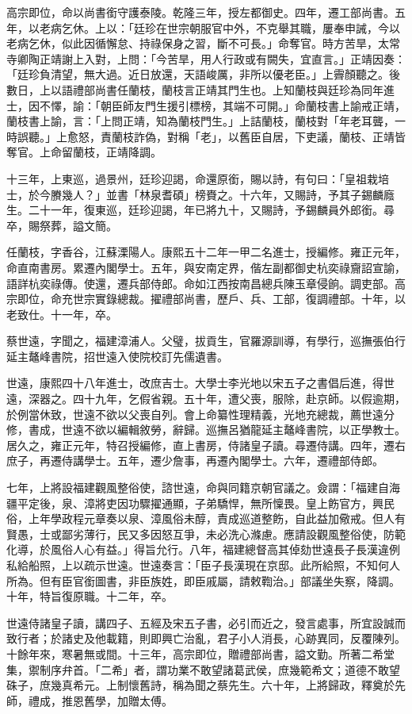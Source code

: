 \begin{pinyinscope}
高宗即位，命以尚書銜守護泰陵。乾隆三年，授左都御史。四年，遷工部尚書。五年，以老病乞休。上以：「廷珍在世宗朝服官中外，不克舉其職，屢奉申誡，今以老病乞休，似此因循懈怠、持祿保身之習，斷不可長。」命奪官。時方苦旱，太常寺卿陶正靖謝上入對，上問：「今苦旱，用人行政或有闕失，宜直言。」正靖因奏：「廷珍負清望，無大過。近日放還，天語峻厲，非所以優老臣。」上霽顏聽之。後數日，上以語禮部尚書任蘭枝，蘭枝言正靖其門生也。上知蘭枝與廷珍為同年進士，因不懌，諭：「朝臣師友門生援引標榜，其端不可開。」命蘭枝書上諭戒正靖，蘭枝書上諭，言：「上問正靖，知為蘭枝門生。」上詰蘭枝，蘭枝對「年老耳聾，一時誤聽。」上愈怒，責蘭枝詐偽，對稱「老」，以舊臣自居，下吏議，蘭枝、正靖皆奪官。上命留蘭枝，正靖降調。

十三年，上東巡，過景州，廷珍迎謁，命還原銜，賜以詩，有句曰：「皇祖栽培士，於今賸幾人？」並書「林泉耆碩」榜賚之。十六年，又賜詩，予其子錫麟廕生。二十一年，復東巡，廷珍迎謁，年已將九十，又賜詩，予錫麟員外郎銜。尋卒，賜祭葬，謚文簡。

任蘭枝，字香谷，江蘇溧陽人。康熙五十二年一甲二名進士，授編修。雍正元年，命直南書房。累遷內閣學士。五年，與安南定界，偕左副都御史杭奕祿齎詔宣諭，語詳杭奕祿傳。使還，遷兵部侍郎。命如江西按南昌總兵陳玉章侵餉。調吏部。高宗即位，命充世宗實錄總裁。擢禮部尚書，歷戶、兵、工部，復調禮部。十年，以老致仕。十一年，卒。

蔡世遠，字聞之，福建漳浦人。父璧，拔貢生，官羅源訓導，有學行，巡撫張伯行延主鼇峰書院，招世遠入使院校訂先儒遺書。

世遠，康熙四十八年進士，改庶吉士。大學士李光地以宋五子之書倡后進，得世遠，深器之。四十九年，乞假省親。五十年，遭父喪，服除，赴京師。以假逾期，於例當休致，世遠不欲以父喪自列。會上命纂性理精義，光地充總裁，薦世遠分修，書成，世遠不欲以編輯敘勞，辭歸。巡撫呂猶龍延主鼇峰書院，以正學教士。居久之，雍正元年，特召授編修，直上書房，侍諸皇子讀。尋遷侍講。四年，遷右庶子，再遷侍講學士。五年，遷少詹事，再遷內閣學士。六年，遷禮部侍郎。

七年，上將設福建觀風整俗使，諮世遠，命與同籍京朝官議之。僉謂：「福建自海疆平定後，泉、漳將吏因功驟擢通顯，子弟驕悍，無所懍畏。皇上飭官方，興民俗，上年學政程元章奏以泉、漳風俗未醇，責成巡道整飭，自此益加儆戒。但人有賢愚，士或鄙劣薄行，民又多因怒互爭，未必洗心滌慮。應請設觀風整俗使，防範化導，於風俗人心有益。」得旨允行。八年，福建總督高其倬劾世遠長子長漢違例私給船照，上以疏示世遠。世遠奏言：「臣子長漢現在京邸。此所給照，不知何人所為。但有臣官銜圖書，非臣族姓，即臣戚屬，請敕鞫治。」部議坐失察，降調。十年，特旨復原職。十二年，卒。

世遠侍諸皇子讀，講四子、五經及宋五子書，必引而近之，發言處事，所宜設誠而致行者；於諸史及他載籍，則即興亡治亂，君子小人消長，心跡異同，反覆陳列。十餘年來，寒暑無或間。十三年，高宗即位，贈禮部尚書，謚文勤。所著二希堂集，禦制序弁首。「二希」者，謂功業不敢望諸葛武侯，庶幾範希文；道德不敢望硃子，庶幾真希元。上制懷舊詩，稱為聞之蔡先生。六十年，上將歸政，釋奠於先師，禮成，推恩舊學，加贈太傅。


\end{pinyinscope}

